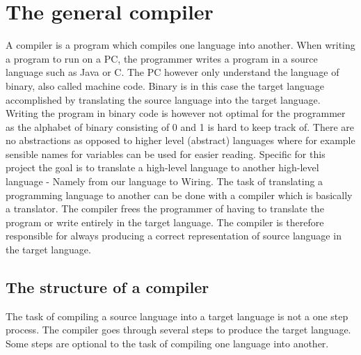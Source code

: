 \section{The general compiler}
A compiler is a program which compiles one language into another. When writing a program to run on a PC, the programmer writes a program in a source language such as Java or C. The PC however only understand the language of binary, also called machine code. Binary is in this case the target language accomplished by translating the source language into the target language. Writing the program in binary code is however not optimal for the programmer as the alphabet of binary consisting of 0 and 1 is hard to keep track of. There are no abstractions as opposed to higher level (abstract) languages where for example sensible names for variables can be used for easier reading. Specific for this project the goal is to translate a high-level language to another high-level language - Namely from our language to Wiring. The task of translating a programming language to another can be done with a compiler which is basically a translator. The compiler frees the programmer of having to translate the program or write entirely in the target language. The compiler is therefore responsible for always producing a correct representation of source language in the target language.

\subsection{The structure of a compiler}
The task of compiling a source language into a target language is not a one step process. The compiler goes through several steps to produce the target language. Some steps are optional to the task of compiling one language into another.\cite{compiler:structure}\\

